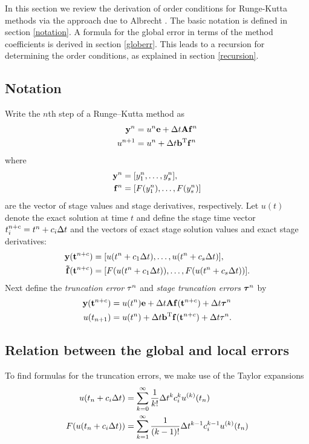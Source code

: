In this section we review the derivation of order conditions for Runge-Kutta
methods via the approach due to Albrecht \cite{albrecht1996}.
The basic notation is defined in section \ref{notation}.  A formula 
for the global error in terms of the method coefficients is derived
in section \ref{globerr}.  This leads to a recursion for determining the order 
conditions, as explained in section \ref{recursion}.

\subsection{Notation\label{notation}}
Write the $n$th step of a Runge--Kutta method as
\begin{subequations} \label{eq:rk}
\begin{align} 
\mathbf{y}^n & = u^{n}\mathbf{e} + \Delta t \mathbf{A} \mathbf{f}^{n} \\
u^{n+1} & = u^{n} + \Delta t \mathbf{b}^\mathrm{T} \mathbf{f}^{n}
\end{align}
\end{subequations}
where 
\begin{align*}
\mathbf{y}^n & = [y_1^n,\dots,y_s^n], \\
\mathbf{f}^n & = [F(y_1^n),\dots,F(y_s^n)]
\end{align*}
are the vector of stage values and stage derivatives, respectively.
Let $u(t)$ denote the exact solution at time $t$ and define
the stage time vector $t^{n+c}_i = t^n+c_i\Delta t$ and
the vectors of exact stage solution values and
exact stage derivatives:
\begin{align*}
    \mathbf{y}(\mathbf{t}^{n+c}) & = [u(t^n+c_1\Delta t),\dots,u(t^n+c_s\Delta t)], \\
    \mathbf{\tilde{f}}(\mathbf{t}^{n+c}) & = [F(u(t^n+c_1\Delta t)),\dots,F(u(t^n+c_s\Delta t))].
\end{align*}
Next define the {\em truncation error} $\tau^n$ and
{\em stage truncation errors} $\boldsymbol{\tau}^n$ by
\begin{subequations} \label{eq:rk_lte}
\begin{align} 
    \mathbf{y}(\mathbf{t}^{n+c}) & = u(t^{n})\mathbf{e} + \Delta t \mathbf{A} \mathbf{f}(\mathbf{t}^{n+c}) + \Delta t \boldsymbol{\tau}^n \\
    u(t_{n+1}) & = u(t^{n}) + \Delta t \mathbf{b}^\mathrm{T}\mathbf{f}(\mathbf{t}^{n+c}) + \Delta t \tau^n.
\end{align}
\end{subequations}

\subsection{Relation between the global and local errors\label{globerr}}
To find formulas for the truncation errors, we make use of 
the Taylor expansions
\begin{subequations} \label{eq:taylor}
\begin{align} 
u(t_{n}+c_i\Delta t) & = \sum_{k=0}^\infty \frac{1}{k!} \Delta t^k c_i^k u^{(k)}(t_{n}) \\
F(u(t_{n}+c_i\Delta t)) & = \sum_{k=1}^\infty \frac{1}{(k-1)!} \Delta t^{k-1} c_i^{k-1} u^{(k)}(t_{n})
\end{align}
\end{subequations}

